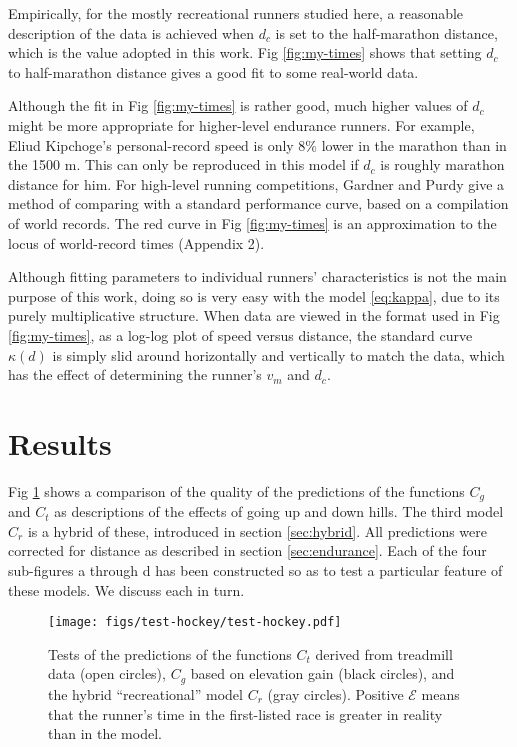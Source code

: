 \documentclass[10pt,letterpaper]{article}
\begin{document}
Empirically, for the mostly recreational runners studied here, a reasonable description of the data is achieved when
$d_c$ is set to the half-marathon distance, which is the value adopted in this work.
Fig \ref{fig:my-times} shows that
setting $d_c$ to half-marathon distance gives a good fit to some real-world data.

Although the fit in Fig \ref{fig:my-times} is rather good,
much higher values of $d_c$ might be more appropriate for higher-level endurance runners.
For example, Eliud Kipchoge's personal-record
speed is only 8\% lower in the marathon than in the 1500 m. This can only be reproduced in this model if $d_c$
is roughly marathon distance for him.
For high-level running competitions, Gardner and Purdy give a
method of comparing with a standard performance curve, based on a compilation of world
records.\cite{gardner} 
The red curve in Fig \ref{fig:my-times} is an approximation to the locus of world-record times (Appendix 2).

Although fitting parameters to individual runners' characteristics is not the main purpose of this work, doing
so is very easy with the model \ref{eq:kappa}, due to its purely multiplicative structure.
When data are viewed in the format used in Fig \ref{fig:my-times}, as a log-log plot of speed versus distance,
the standard curve $\kappa(d)$ is simply slid around horizontally and vertically to match the data, which
has the effect of determining the runner's $v_m$ and $d_c$.

\section{Results}\label{subsec:hills}

Fig \ref{fig:test-hockey} shows a comparison of the quality of the predictions of the functions
$C_g$ and $C_t$ as descriptions of the effects of going up and down hills.
The third model $C_r$ is a hybrid of these, introduced in section \ref{sec:hybrid}.
All predictions were corrected for distance as described in section \ref{sec:endurance}.
Each of the four sub-figures a through d has been constructed so as to test a particular
feature of these models. We discuss each in turn.

\begin{figure}[h]
\texttt{[image: figs/test-hockey/test-hockey.pdf]}
\centering
\caption{Tests of the predictions of the functions $C_t$ derived from treadmill data (open circles),
$C_g$ based on elevation gain (black circles), and the hybrid ``recreational'' model
$C_r$ (gray circles). Positive $\mathcal{E}$ means that the runner's
time in the first-listed race is greater in reality than in the model.
}
\label{fig:test-hockey}
\end{figure}
\end{document}

